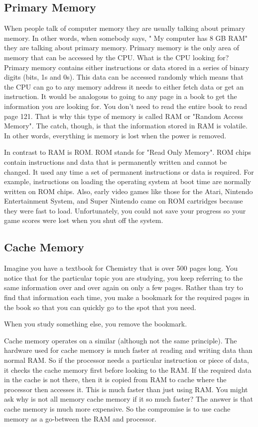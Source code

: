 \subsection*{Primary Memory}
When people talk of computer memory they are usually talking about primary memory. In other words, when somebody says, " My computer has 8 GB RAM" they are talking about primary memory. Primary memory is the only area of memory that can be accessed by the CPU. What is the CPU looking for? Primary memory contains either instructions or data stored in a series of binary digits (bits, 1s and 0s). This data can be accessed randomly which means that the CPU can go to any memory address it needs to either fetch data or get an instruction. It would be analogous to going to any page in a book to get the information you are looking for. You don't need to read the entire book to read page 121. That is why this type of memory is called RAM or "Random Access Memory". The catch, though, is that the information stored in RAM is volatile. In other words, everything is memory is lost when the power is removed.

In contrast to RAM is ROM. ROM stands for "Read Only Memory". ROM chips contain instructions and data that is permanently written and cannot be changed. It used any time a set of permanent instructions or data is required. For example, instructions on loading the operating system at boot time are normally written on ROM chips. Also, early video games like those for the Atari, Nintendo Entertainment System, and Super Nintendo came on ROM cartridges because they were fast to load. Unfortunately, you could not save your progress so your game scores were lost when you shut off the system.

\subsection*{Cache Memory}
Imagine you have a textbook for Chemistry that is over 500 pages long. You notice that for the particular topic you are studying, you keep referring to the same information over and over again on only a few pages. Rather than try to find that information each time, you make a bookmark for the required pages in the book so that you can quickly go to the spot that you need.

When you study something else, you remove the bookmark.

Cache memory operates on a similar (although not the same principle). The hardware used for cache memory is much faster at reading and writing data than normal RAM. So if the processor needs a particular instruction or piece of data, it checks the cache memory first before looking to the RAM. If the required data in the cache is not there, then it is copied from RAM to cache where the processor then accesses it. This is much faster than just using RAM. You might ask why is not all memory cache memory if it so much faster? The answer is that cache memory is much more expensive. So the compromise is to use cache memory as a go-between the RAM and processor.

